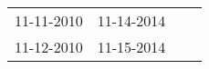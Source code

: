 \begin{supertabular}{llll}
 11-11-2010 &  11-14-2014 \\
 11-12-2010 &  11-15-2014 \\
\end{supertabular}
